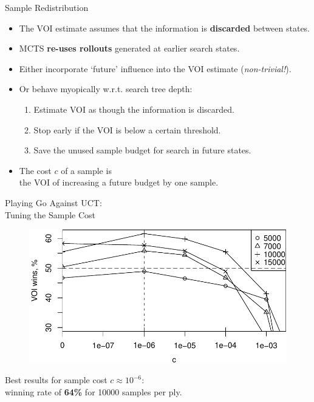 \documentclass{beamer}
\begin{document}
\begin{frame}{Sample Redistribution}
\begin{itemize}
\item The VOI estimate assumes that the information is {\bf discarded}
  between states.
\item MCTS {\bf re-uses rollouts} generated at earlier search states.
\vspace{\baselineskip}
\item Either incorporate `future' influence into the VOI estimate
  ({\it non-trivial!}).
\item Or behave myopically w.r.t. search tree depth:
\begin{enumerate}
\item Estimate VOI as though the information is discarded.
\item Stop early if the VOI is below a certain threshold.
\item Save the unused sample budget for search in future states.
\end{enumerate}
\item The cost $c$ of a sample  is\\\hspace{1em} the VOI of increasing a
  future budget by one sample.
\end{itemize}
\end{frame}

\begin{frame}{Playing Go Against UCT:\\\hspace{2em}Tuning the Sample Cost}
\begin{figure}[h]
  \centering
  \includegraphics[scale=0.65]{uctvoi.pdf}
\end{figure}
Best results for sample cost $c\approx 10^{-6}$:\\\hspace{2em}winning rate of {\bf
  64\%} for 10000 samples per ply.
\end{frame}
\end{document}
